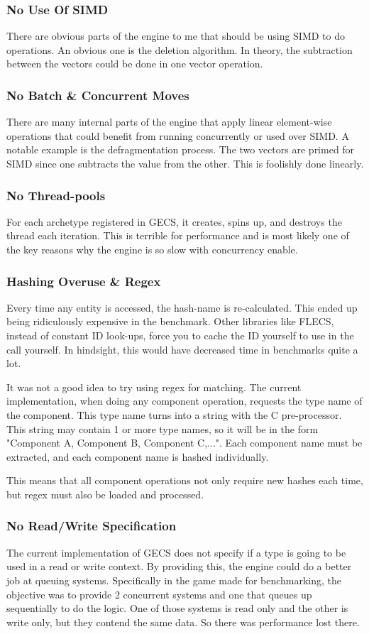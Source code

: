 \subsubsection{No Use Of SIMD}
There are obvious parts of the engine to me that should be using SIMD to do operations. An obvious one is the deletion algorithm. In theory, the subtraction between the vectors could be done in one vector operation.

\subsubsection{No Batch \& Concurrent Moves}
There are many internal parts of the engine that apply linear element-wise operations that could benefit from running concurrently or used over SIMD. A notable example is the defragmentation process. The two vectors are primed for SIMD since one subtracts the value from the other. This is foolishly done linearly.

\subsubsection{No Thread-pools}
For each archetype registered in GECS, it creates, spins up, and destroys the thread each iteration. This is terrible for performance and is most likely one of the key reasons why the engine is so slow with concurrency enable.

\subsubsection{Hashing Overuse \& Regex}
Every time any entity is accessed, the hash-name is re-calculated. This ended up being ridiculously expensive in the benchmark. Other libraries like FLECS, instead of constant ID look-ups, force you to cache the ID yourself to use in the call yourself. In hindsight, this would have decreased time in benchmarks quite a lot.

It was not a good idea to try using regex for matching. The current implementation, when doing any component operation, requests the type name of the component. This type name turns into a string with the C pre-processor. This string may contain 1 or more type names, so it will be in the form "Component A, Component B, Component C,...". Each component name must be extracted, and each component name is hashed individually. 

This means that all component operations not only require new hashes each time, but regex must also be loaded and processed.

\subsubsection{No Read/Write Specification}
The current implementation of GECS does not specify if a type is going to be used in a read or write context. By providing this, the engine could do a better job at queuing systems. Specifically in the game made for benchmarking, the objective was to provide 2 concurrent systems and one that queues up sequentially to do the logic. One of those systems is read only and the other is write only, but they contend the same data. So there was performance lost there.

\newpage